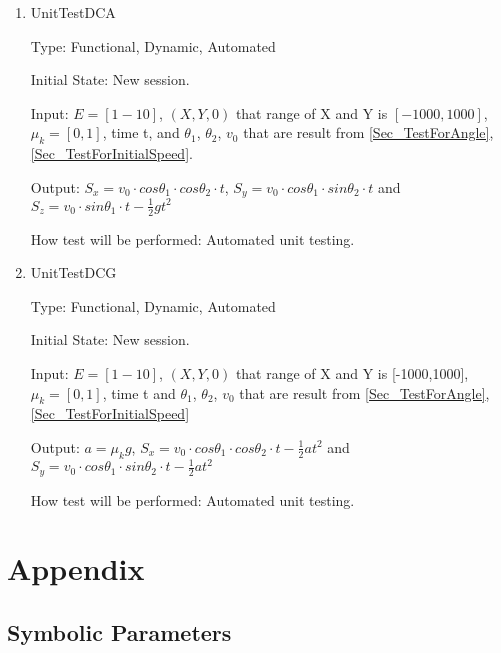 \documentclass[12pt, titlepage]{article}
\begin{document}
\begin{enumerate}
	
	\item{UnitTestDCA\\}
	
	Type: Functional, Dynamic, Automated
	
	Initial State: New session.
	
	Input: $E = [1-10]$, $(X,Y,0)$ that range of X and Y is $[-1000,1000]$, $\mu_{k} = [0,1]$, time t, and $\theta_{1}$, $\theta_{2}$, $v_{0}$ that are result from \ref{Sec_TestForAngle}, \ref{Sec_TestForInitialSpeed}.
	
	Output: $S_{x}=v_{0}\cdot cos\theta _{1}\cdot cos\theta _{2}\cdot t$, $S_{y}=v_{0}\cdot cos\theta _{1}\cdot sin\theta _{2}\cdot t$ and $S_{z}=v_{0}\cdot sin\theta _{1}\cdot t-\frac{1}{2}gt^{2}$
	
	How test will be performed: Automated unit testing.
	
	\item{UnitTestDCG\\}
	
	Type: Functional, Dynamic, Automated
	
	Initial State: New session.
	
	Input: $E = [1-10]$, $(X,Y,0)$ that range of X and Y is [-1000,1000], $\mu_{k} = [0,1]$, time t and $\theta_{1}$, $\theta_{2}$, $v_{0}$ that are result from \ref{Sec_TestForAngle}, \ref{Sec_TestForInitialSpeed}
	
	Output: $a = \mu_{k}g$, $S_{x}=v_{0}\cdot cos\theta _{1}\cdot cos\theta _{2}\cdot t-\frac{1}{2}at^{2}$ and $S_{y}=v_{0}\cdot cos\theta _{1}\cdot sin\theta _{2}\cdot t-\frac{1}{2}at^{2}$ 
	
	How test will be performed: Automated unit testing.
	
\end{enumerate}





\newpage

\section{Appendix}

\subsection{Symbolic Parameters}
\end{document}
